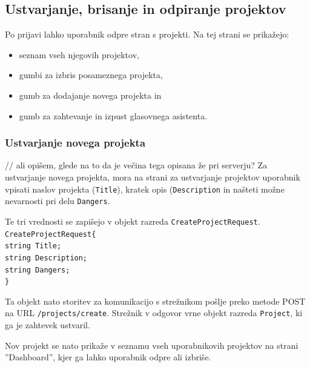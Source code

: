 \documentclass[a4paper, 12pt]{book}
\begin{document}
\subsection{Ustvarjanje, brisanje in odpiranje projektov}

Po prijavi lahko uporabnik odpre stran s projekti.
Na tej strani se prikažejo:
\begin{itemize}
	\item seznam vseh njegovih projektov, 
	\item gumbi za izbris posameznega projekta,
	\item gumb za dodajanje novega projekta in
	\item gumb za zahtevanje in izpust glasovnega asistenta.
\end{itemize}

\subsubsection{Ustvarjanje novega projekta}

// ali opišem, glede na to da je večina tega opisana že pri serverju?
Za ustvarjanje novega projekta, mora na strani za ustvarjanje projektov uporabnik vpisati naslov projekta (\texttt{Title}), kratek opis (\texttt{Description} in našteti možne nevarnosti pri delu \texttt{Dangers}.

Te tri vrednosti se zapišejo v objekt razreda \texttt{CreateProjectRequest}.
\noindent \texttt{CreateProjectRequest\{ \\
	string Title; \\
	string Description; \\
	string Dangers; \\
\} }

Ta objekt nato storitev za komunikacijo s strežnikom pošlje preko metode POST na URL \texttt{/projects/create}.
Strežnik v odgovor vrne objekt razreda \texttt{Project}, ki ga je zahtevek ustvaril.

Nov projekt se nato prikaže v seznamu vseh uporabnikovih projektov na strani ''Dashboard'', kjer ga lahko uporabnik odpre ali izbriše.
\end{document}
